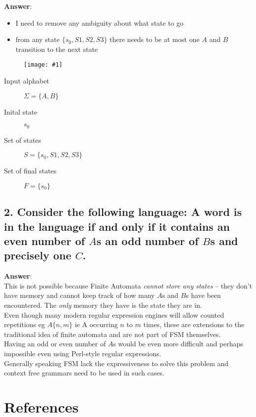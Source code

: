 \documentclass[a4paper, 14pt]{report}
\newcommand{\centeredimg}[1]{%
	\begin{figure}[h]
		\begin{center}
			\texttt{[image: \#1]}
		\end{center}
\end{figure}}
\newcommand{\answer}[1]{%
	\begin{flushleft}
		\textbf{Answer}:\\
			#1
	\end{flushleft}}
\newcommand{\question}[1]{\subsection*{#1}}
\begin{document}
\answer{%

	\begin{itemize}		
		\item I need to remove any ambiguity about what state to go 
		\item from any state $\{s_0, S1, S2, S3\}$ there needs to be at most one $A$ and $B$
			transition to the next state
	\end{itemize}		

	\centeredimg{rl_1_c.jpg}

	\hline
	\begin{description}
		\item [Input alphabet] $\Sigma = \{A, B\}$
		\item [Inital state] $s_0$
		\item [Set of states] $S = \{s_0, S1, S2, S3\}$
		\item [Set of final states] $F = \{s_0\}$
	\end{description}
	\hline
}

\question{2. Consider the following language: A word is in the language if
  and only if it contains an even number of $A$s an odd number of $B$s and precisely one $C$.}

\answer{This is not possible because Finite Automata \textit{cannot store any states}
	-- they don't have memory and cannot keep track of how many $A$s
	and $B$s have been encountered. The \textit{only} memory they have is the
	state they are in.  \\
	Even though many modern regular expression engines will allow
	counted repetitions eg $A\{n,m\}$ ie A occurring $n$ to $m$ times,
	these are extensions to the traditional idea of finite automata
	and are not part of FSM themselves. \\ 
	Having an odd or even number of $A$s would be even more difficult
	and perhaps impossible even using Perl-style regular expressions. \\
	Generally speaking FSM lack the expressiveness to solve this problem
	and context free grammars need to be used in such cases.}

\pagebreak

\section*{References}
\end{document}
